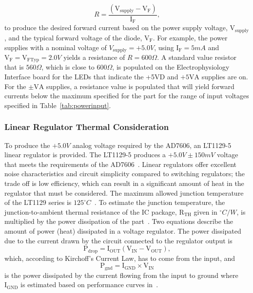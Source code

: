 \begin{equation}
\label{equ:ledres}
R = \frac{(\mathrm{V}_{\mathrm{supply}} - \mathrm{V}_{\mathrm{F}})}{\mathrm{I}_\mathrm{F}},
\end{equation}
to produce the desired forward current based on the power supply voltage, $\mathrm{V}_{\mathrm{supply}}$, and the typical forward voltage of the diode, $\mathrm{V}_\mathrm{F}$.  For example, the power supplies with a nominal voltage of $\unit{V}_{\mathrm{supply}}=+5.0\unit{V}$, using $\mathrm{I}_\mathrm{F}=5\unit{mA}$ and $\mathrm{V}_\mathrm{F}=\mathrm{V}_{\mathrm{FTyp}}=2.0\unit{V}$ yields a resistance of $R=600\unit{\Omega}$.  A standard value resistor that is $560\unit{\Omega}$, which is close to $600\unit{\Omega}$, is populated on the Electrophysiology Interface board for the LEDs that indicate the +5VD and $+5\mathrm{VA}$ supplies are on.  For the $\pm \mathrm{VA}$ supplies, a resistance value is populated that will yield forward currents below the maximum specified for the part for the range of input voltages specified in Table~\ref{tab:powerinput}.


\subsubsection{Linear Regulator Thermal Consideration}

To produce the $+5.0\unit{V}$ analog voltage required by the AD7606, an LT1129-5 linear regulator is provided.  The LT1129-5 produces a $+5.0V \pm 150mV$ voltage that meets the requirements of the AD7606~\cite{LT1129ds}.  Linear regulators offer excellent noise characteristics and circuit simplicity compared to switching regulators; the trade off is low efficiency, which can result in a significant amount of heat in the regulator that must be considered.  The maximum allowed junction temperature of the LT1129 series is $125 ^\circ \unit{C}$~\cite{LT1129ds}.  To estimate the junction temperature, the junction-to-ambient thermal resistance of the IC package, $\mathrm{R}_{\mathrm{TH}}$ given in $^\circ \unit{C} / \unit{W}$, is multiplied by the power dissipation of the part~\cite{LT1129ds}.  Two equations describe the amount of power (heat) dissipated in a voltage regulator.  The power dissipated due to the current drawn by the circuit connected to the regulator output is
\begin{equation}
\label{equ:Pdrop}
\mathrm{P}_{\mathrm{drop}} = \mathrm{I}_{\mathrm{OUT}} (\mathrm{V}_{\mathrm{IN}} - \mathrm{V}_{\mathrm{OUT}}),
\end{equation}
which, according to Kirchoff's Current Law, has to come from the input, and 
\begin{equation}
\label{equ:Pgnd}
\mathrm{P}_{\mathrm{gnd}} = \mathrm{I}_{\mathrm{GND}} \times \mathrm{V}_{\mathrm{IN}}
\end{equation}
is the power dissipated by the current flowing from the input to ground where $\mathrm{I}_{\mathrm{GND}}$ is estimated based on performance curves in~\cite{LT1129ds}.


